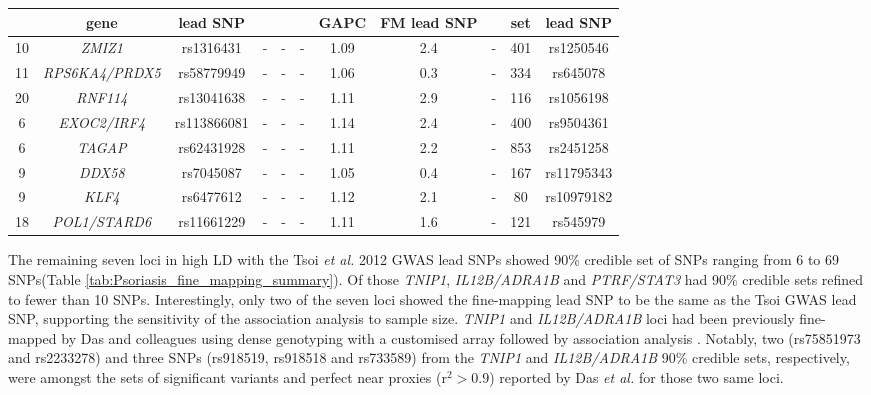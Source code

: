 \begin{landscape}
\begin{center}
\begin{longtable}[ht]{c c c c c c c c c c c}
              & \textbf{gene} & \textbf{lead SNP} &        &                  &           &\textbf{GAPC} & \textbf{FM lead SNP} &             & \textbf{set}           &\textbf{lead SNP} \\
\midrule
\midrule
10 & \textit{ZMIZ1}	                   &  rs1316431	    & -& -& -&  1.09  & 2.4	 & -& 401 &rs1250546\\
11 & \textit{RPS6KA4/PRDX5}	&  rs58779949	& -&- &- &  1.06  & 0.3	 & -& 334 & rs645078  \\
20 & \textit{RNF114}	            & rs13041638	 & -& -& -&   1.11  &2.9	& - & 116 & rs1056198	 \\
6	 & \textit{EXOC2/IRF4}	    & rs113866081	 &- & -&- &  1.14   &2.4	&-   &400 &rs9504361 \\
6	 & \textit{TAGAP}	            & rs62431928	  & -& -& -&   1.11  &2.2	  & -   & 853&rs2451258 \\
9	 & \textit{DDX58}	            & rs7045087	      & -& -& -&   1.05 &0.4	 &  -  & 167 &rs11795343  \\
9	 & \textit{KLF4}	               & rs6477612	     & -&- & -&   1.12  &2.1	  &   - & 80   &rs10979182 \\
18 & \textit{POL1/STARD6}	  & rs11661229	   & -& -&- &   1.11  &1.6	     &  - & 121  &rs545979\\
\bottomrule
\end{longtable}
\end{center}
\end{landscape}


The remaining seven loci in high LD with the Tsoi \textit{et al.} 2012 GWAS lead SNPs showed 90\% credible set of SNPs ranging from 6 to 69 SNPs(Table \ref{tab:Psoriasis_fine_mapping_summary}). Of those \textit{TNIP1}, \textit{IL12B/ADRA1B} and \textit{PTRF/STAT3} had 90\% credible sets refined to fewer than 10 SNPs. Interestingly, only two of the seven loci showed the fine-mapping lead SNP to be the same as the Tsoi GWAS lead SNP, supporting the sensitivity of the association analysis to sample size. \textit{TNIP1} and \textit{IL12B/ADRA1B} loci had been previously fine-mapped by Das and colleagues using dense genotyping with a customised array followed by association analysis \parencite{Das2014}. Notably, two (rs75851973 and rs2233278) and three SNPs (rs918519, rs918518 and rs733589) from the \textit{TNIP1} and \textit{IL12B/ADRA1B} 90\% credible sets, respectively, were amongst the sets of significant variants and perfect near proxies (r$^2>0.9$) reported  by Das \textit{et al.} for those two same loci.  




